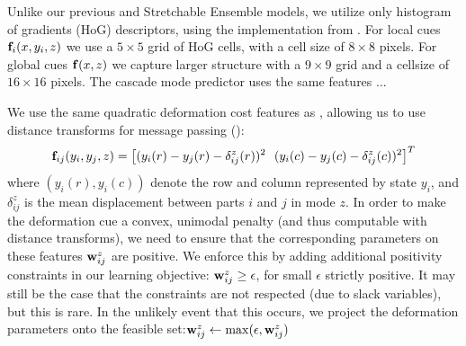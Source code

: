 Unlike our previous \CPS and Stretchable Ensemble models, we utilize only 
histogram of gradients (HoG) descriptors, using the implementation from
\citet{dpm}.  For local cues $\mathbf{f}_i(x,y_i,z)$ we use a $5 \times 5$ grid of HoG 
cells, with a cell size of $8 \times 8$ pixels. For global cues $\mathbf{f}(x,z)$ we 
capture larger structure with a $9 \times 9$ grid and a cellsize of 
$16 \times 16$ pixels.   The cascade mode predictor uses the same features ...

 We use the same quadratic deformation cost features as \citet{felz05}, allowing us to use
distance transforms for message passing ():
$$
\mathbf{f}_{ij}(y_i,y_j,z) = \left[(y_i(r) - y_j(r) - \delta_{ij}^z(r))^2~~(y_i(c) - y_j(c) - \delta_{ij}^z(c))^2\right]^T
$$
where $(y_i(r),y_i(c))$ denote the row and column represented by state $y_i$, 
and $\delta_{ij}^z$ is the mean displacement between parts $i$ and $j$ in mode 
$z$.  In order to make the deformation cue a convex, unimodal penalty (and thus 
computable with distance transforms), we need to ensure that the corresponding 
parameters on these features $\mathbf{w}_{ij}^z$ are positive. We enforce this by 
adding additional positivity constraints in our learning objective: $\mathbf{w}_{ij}^z 
\geq \epsilon$, for small $\epsilon$ strictly positive.  It may still be the 
case that the constraints are not respected (due to slack variables), but this 
is rare.  In the unlikely event that this occurs, we project the deformation 
parameters onto the feasible set:$\mathbf{w}_{ij}^z \leftarrow 
\max(\epsilon,\mathbf{w}_{ij}^z)$ 

